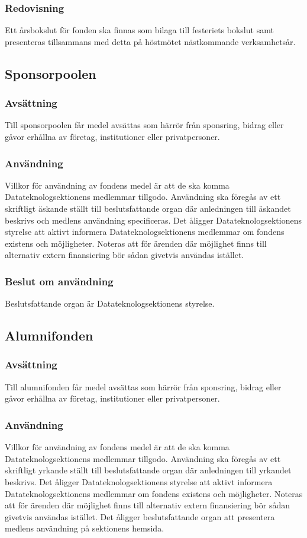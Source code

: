 \documentclass{datateknologsektionen-document}
\begin{document}
\subsubsection{Redovisning}
Ett årsbokslut för fonden ska finnas som bilaga till festeriets bokslut samt presenteras
tillsammans med detta på höstmötet nästkommande verksamhetsår.
\subsection{Sponsorpoolen}
\subsubsection{Avsättning}
Till sponsorpoolen får medel avsättas som härrör från sponsring, bidrag eller gåvor erhållna av
företag, institutioner eller privatpersoner.
\subsubsection{Användning}
Villkor för användning av fondens medel är att de ska komma Datateknologsektionens
medlemmar tillgodo. Användning ska föregås av ett skriftligt äskande ställt till beslutsfattande
organ där anledningen till äskandet beskrivs och medlens användning specificeras. Det åligger
Datateknologsektionens styrelse att aktivt informera Datateknologsektionens medlemmar om
fondens existens och möjligheter. Noteras att för ärenden där möjlighet finns till alternativ
extern finansiering bör sådan givetvis användas istället.
\subsubsection{Beslut om användning}
Beslutsfattande organ är Datateknologsektionens styrelse.
\subsection{Alumnifonden}
\subsubsection{Avsättning}
Till alumnifonden får medel avsättas som härrör från sponsring, bidrag eller gåvor erhållna av
företag, institutioner eller privatpersoner.
\subsubsection{Användning}
Villkor för användning av fondens medel är att de ska komma Datateknologsektionens
medlemmar tillgodo. Användning ska föregås av ett skriftligt yrkande ställt till beslutsfattande
organ där anledningen till yrkandet beskrivs. Det åligger Datateknologsektionens styrelse att
aktivt informera Datateknologsektionens medlemmar om fondens existens och möjligheter.
Noteras att för ärenden där möjlighet finns till alternativ extern finansiering bör sådan givetvis
användas istället. Det åligger beslutsfattande organ att presentera medlens användning på
sektionens hemsida.
\end{document}
